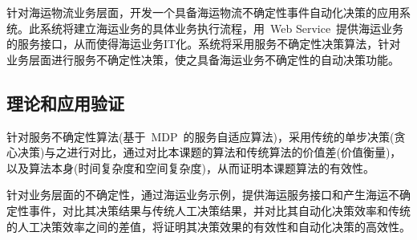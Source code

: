 针对海运物流业务层面，开发一个具备海运物流不确定性事件自动化决策的应用系统。此系统将建立海运业务的具体业务执行流程，用~Web Service~提供海运业务的服务接口，从而使得海运业务IT化。系统将采用服务不确定性决策算法，针对业务层面进行服务不确定性决策，使之具备海运业务不确定性的自动决策功能。

\subsection{理论和应用验证}

针对服务不确定性算法(基于~MDP~的服务自适应算法)，采用传统的单步决策(贪心决策)与之进行对比，通过对比本课题的算法和传统算法的价值差(价值衡量)，以及算法本身(时间复杂度和空间复杂度)，从而证明本课题算法的有效性。

针对业务层面的不确定性，通过海运业务示例，提供海运服务接口和产生海运不确定性事件，对比其决策结果与传统人工决策结果，并对比其自动化决策效率和传统的人工决策效率之间的差值，将证明其决策效果的有效性和自动化决策的高效性。

